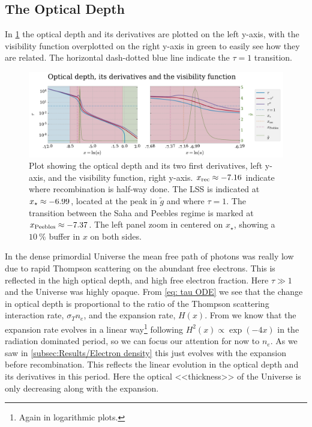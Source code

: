 \documentclass[10pt,a4paper]{article}
\begin{document}
\subsection{The Optical Depth}
\label{subsec:Results/tau}
In \cref{fig:tau} the optical depth and its derivatives are plotted on the left y-axis, with the visibility function overplotted on the right y-axis in green to easily see how they are related. The horizontal dash-dotted blue line indicate the $\tau = 1$ transition.
\begin{figure}[ht]
    \centering
    \includegraphics[scale=0.5]{../figs/optical_depth.pdf}
    \caption{Plot showing the optical depth and its two first derivatives, left y-axis, and the visibility function, right y-axis. $x_{\rm{rec}}\approx-7.16$ indicate where recombination is half-way done. The LSS is indicated at $x_{\rm{\star}}\approx-6.99$, located at the peak in $\tilde{g}$ and where $\tau=1$. The transition between the Saha and Peebles regime is marked at $x_{\rm{Peebles}}\approx-7.37 $. The left panel zoom in centered on $x_{\star}$, showing a $\SI{10}{\%}$ buffer in $x$ on both sides.}
    \label{fig:tau}
\end{figure}

In the dense primordial Universe the mean free path of photons was really low due to rapid Thompson scattering on the abundant free electrons. This is reflected in the high optical depth, and high free electron fraction. Here $\tau \gg 1$ and the Universe was highly opaque. From \cref{eq: tau ODE} we see that the change in optical depth is proportional to the ratio of the Thompson scattering interaction rate, $\sigma_T n_e$, and the expansion rate, $H(x)$. From \cite{milestone1} we know that the expansion rate evolves in a linear way\footnote{Again in logarithmic plots.} following $H^2(x) \propto \exp(-4x)$ in the radiation dominated period, so we can focus our attention for now to $n_e$. As we saw in \cref{subsec:Results/Electron density} this just evolves with the expansion before recombination. This reflects the linear evolution in the optical depth and its derivatives in this period. Here the optical <<thickness>> of the Universe is only decreasing along with the expansion.
\end{document}
